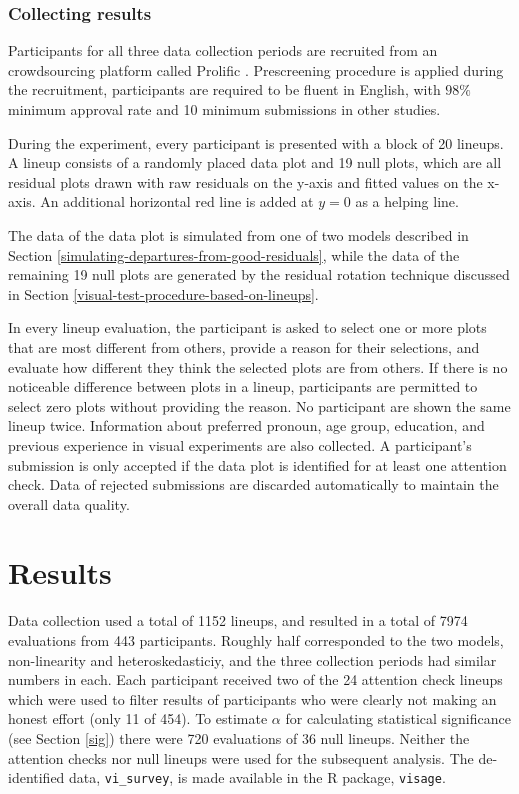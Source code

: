 \documentclass[]{interact}
\theoremstyle{plain}%
\theoremstyle{definition}
\theoremstyle{remark}
\begin{document}
\hypertarget{collecting-results}{%
\subsubsection{Collecting results}\label{collecting-results}}

Participants for all three data collection periods are recruited from an
crowdsourcing platform called Prolific \citep{palan2018prolific}.
Prescreening procedure is applied during the recruitment, participants
are required to be fluent in English, with \(98\%\) minimum approval
rate and 10 minimum submissions in other studies.

During the experiment, every participant is presented with a block of 20
lineups. A lineup consists of a randomly placed data plot and 19 null
plots, which are all residual plots drawn with raw residuals on the
y-axis and fitted values on the x-axis. An additional horizontal red
line is added at \(y = 0\) as a helping line.

The data of the data plot is simulated from one of two models described
in Section \ref{simulating-departures-from-good-residuals}, while the
data of the remaining 19 null plots are generated by the residual
rotation technique discussed in Section
\ref{visual-test-procedure-based-on-lineups}.

In every lineup evaluation, the participant is asked to select one or
more plots that are most different from others, provide a reason for
their selections, and evaluate how different they think the selected
plots are from others. If there is no noticeable difference between
plots in a lineup, participants are permitted to select zero plots
without providing the reason. No participant are shown the same lineup
twice. Information about preferred pronoun, age group, education, and
previous experience in visual experiments are also collected. A
participant's submission is only accepted if the data plot is identified
for at least one attention check. Data of rejected submissions are
discarded automatically to maintain the overall data quality.

\hypertarget{results}{%
\section{Results}\label{results}}

Data collection used a total of 1152 lineups, and resulted in a total of
7974 evaluations from 443 participants. Roughly half corresponded to the
two models, non-linearity and heteroskedasticiy, and the three
collection periods had similar numbers in each. Each participant
received two of the 24 attention check lineups which were used to filter
results of participants who were clearly not making an honest effort
(only 11 of 454). To estimate \(\alpha\) for calculating statistical
significance (see Section \ref{sig}) there were 720 evaluations of 36
null lineups. Neither the attention checks nor null lineups were used
for the subsequent analysis. The de-identified data,
\texttt{vi\_survey}, is made available in the R package,
\texttt{visage}.
\end{document}
